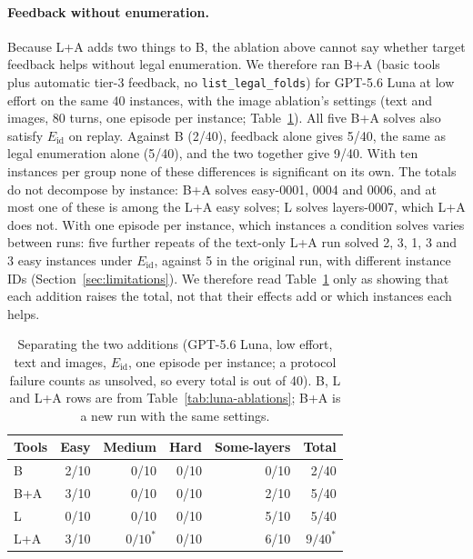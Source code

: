\paragraph{Feedback without enumeration.}
\label{sec:results-feedback-only}
Because L+A adds two things to B, the ablation above cannot say whether target feedback helps
without legal enumeration. We therefore ran B+A (basic tools plus automatic tier-3 feedback, no
\texttt{list\_legal\_folds}) for GPT-5.6 Luna at low effort on the same 40 instances, with the
image ablation's settings (text and images, 80 turns, one episode per instance;
Table~\ref{tab:feedback-only}). All five B+A solves also satisfy $E_{\mathrm{id}}$ on replay.
Against B (2/40), feedback alone gives 5/40, the same as legal enumeration alone (5/40), and the
two together give 9/40. With ten instances per group none of these differences is significant on
its own. The totals do not decompose by instance: B+A solves easy-0001, 0004 and 0006, and at most
one of these is among the L+A easy solves; L solves layers-0007, which L+A does not. With one
episode per instance, which instances a condition solves varies between runs: five further repeats of the
text-only L+A run solved 2, 3, 1, 3 and 3 easy instances under $E_{\mathrm{id}}$, against 5 in
the original run, with different instance IDs (Section~\ref{sec:limitations}). We therefore read Table~\ref{tab:feedback-only} only as showing
that each addition raises the total, not that their effects add or which instances each helps.

\begin{table}[htbp]
\centering
\caption{Separating the two additions (GPT-5.6 Luna, low effort, text and images, $E_{\mathrm{id}}$,
one episode per instance; a protocol failure counts as unsolved, so every total is out of 40).
B, L and L+A rows are from Table~\ref{tab:luna-ablations}; B+A is a new run with the same settings.}
\label{tab:feedback-only}
\small
\begin{tabular}{lrrrrr}
\hline
Tools & Easy & Medium & Hard & Some-layers & Total \\
\hline
B & 2/10 & 0/10 & 0/10 & 0/10 & 2/40 \\
B+A & 3/10 & 0/10 & 0/10 & 2/10 & 5/40 \\
L & 0/10 & 0/10 & 0/10 & 5/10 & 5/40 \\
L+A & 3/10 & $0/10^{*}$ & 0/10 & 6/10 & $9/40^{*}$ \\
\hline
\end{tabular}
\end{table}

